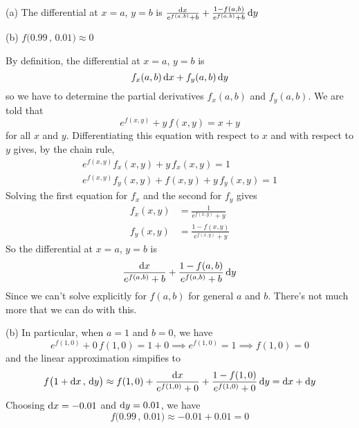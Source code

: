 %

\begin{answer}
(a) The differential at $x=a$, $y=b$ is
$
\frac{\mathrm{d}x}{e^{f(a,b)}+b} + \frac{1-f(a,b)}{e^{f(a,b)}+b} \,\mathrm{d}y
$

(b) $f\big(0.99\,,\,0.01\big) \approx 0$
\end{answer}

\begin{solution}
By definition, the differential at $x=a$, $y=b$ is
\begin{equation*}
f_x(a,b)\,\mathrm{d}x + f_y(a,b)\,\mathrm{d}y
\end{equation*}
so we have to determine the partial derivatives $f_x(a,b)$ and $f_y(a,b)$.
We are told that
\begin{equation*}
e^{f(x,y)} + y\,f(x,y) = x + y
\end{equation*}
for all $x$ and $y$.
Differentiating this equation with respect to $x$
and with respect to $y$ gives, by the chain rule,
\begin{align*}
e^{f(x,y)}f_x(x,y) + y\,f_x(x,y) = 1 \\
e^{f(x,y)}f_y(x,y) + f(x,y) +y\,f_y(x,y) = 1 
\end{align*}
Solving the first equation for $f_x$ and the second for $f_y$ gives
\begin{align*}
f_x(x,y) &=  \frac{1}{e^{f(x,y)}+y} \\
f_y(x,y) &= \frac{1-f(x,y)}{e^{f(x,y)}+y} 
\end{align*}
So the differential at $x=a$, $y=b$ is
\begin{equation*}
\frac{\mathrm{d}x}{e^{f(a,b)}+b} + \frac{1-f(a,b)}{e^{f(a,b)}+b} \,\mathrm{d}y
\end{equation*} 
Since we can't solve explicitly for $f(a,b)$ for general $a$ and $b$.
There's not much more that we can do with this. 

(b) In particular, when $a=1$ and $b=0$, we have 
\begin{equation*}
e^{f(1,0)} + 0\,f(1,0) = 1 + 0
\implies 
e^{f(1,0)}  = 1 
\implies 
f(1,0)=0
\end{equation*}
and the linear approximation simpifies to
\begin{equation*}
f\big(1+\mathrm{d}x\,,\,\mathrm{d}y\big)
  \approx f(1,0) + \frac{\mathrm{d}x}{e^{f(1,0)}+0} 
        + \frac{1-f(1,0)}{e^{f(1,0)}+0}   \,\mathrm{d}y
  = \mathrm{d}x +\mathrm{d}y
\end{equation*}
Choosing $\mathrm{d}x = -0.01$ and $\mathrm{d}y = 0.01$, we have
\begin{equation*}
f\big(0.99\,,\,0.01\big)
  \approx  -0.01 + 0.01
  =0
\end{equation*}
\end{solution}

